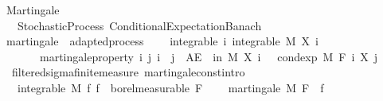 %
\begin{isabellebody}%
%
%
\isadelimtheory
%
\endisadelimtheory
%
\isatagtheory
{}\isamarkupfalse%
\ Martingale\ \ \ \ \ \ \ \ \ \ \ \ \ \ \ \ \ \isanewline
\ \ \ Stochastic{\isacharunderscore}{\kern0pt}Process\ Conditional{\isacharunderscore}{\kern0pt}Expectation{\isacharunderscore}{\kern0pt}Banach\isanewline
{}%
\endisatagtheory
{\isafoldtheory}%
%
\isadelimtheory
%
\endisadelimtheory
%
\isadelimdocument
%
\endisadelimdocument
%
\isatagdocument
%
\isamarkuptrue%
%
\endisatagdocument
{\isafolddocument}%
%
\isadelimdocument
%
\endisadelimdocument
{}\isamarkupfalse%
\ martingale\ {\isacharequal}{\kern0pt}\ adapted{\isacharunderscore}{\kern0pt}process\ {\isacharplus}{\kern0pt}\isanewline
\ \ \ integrable{\isacharcolon}{\kern0pt}\ {\isachardoublequoteopen}{\isasymAnd}i{\isachardot}{\kern0pt}\ integrable\ M\ {\isacharparenleft}{\kern0pt}X\ i{\isacharparenright}{\kern0pt}{\isachardoublequoteclose}\isanewline
\ \ \ \ \ \ \ martingale{\isacharunderscore}{\kern0pt}property{\isacharcolon}{\kern0pt}\ {\isachardoublequoteopen}{\isasymAnd}i\ j{\isachardot}{\kern0pt}\ i\ {\isasymle}\ j\ {\isasymLongrightarrow}\ AE\ {\isasymxi}\ in\ M{\isachardot}{\kern0pt}\ X\ i\ {\isasymxi}\ {\isacharequal}{\kern0pt}\ cond{\isacharunderscore}{\kern0pt}exp\ M\ {\isacharparenleft}{\kern0pt}F\ i{\isacharparenright}{\kern0pt}\ {\isacharparenleft}{\kern0pt}X\ j{\isacharparenright}{\kern0pt}\ {\isasymxi}{\isachardoublequoteclose}\isanewline
\isanewline
{}\isamarkupfalse%
\ {\isacharparenleft}{\kern0pt}\ filtered{\isacharunderscore}{\kern0pt}sigma{\isacharunderscore}{\kern0pt}finite{\isacharunderscore}{\kern0pt}measure{\isacharparenright}{\kern0pt}\ martingale{\isacharunderscore}{\kern0pt}const{\isacharbrackleft}{\kern0pt}intro{\isacharbrackright}{\kern0pt}{\isacharcolon}{\kern0pt}\ \ \isanewline
\ \ \ {\isachardoublequoteopen}integrable\ M\ f{\isachardoublequoteclose}\ {\isachardoublequoteopen}f\ {\isasymin}\ borel{\isacharunderscore}{\kern0pt}measurable\ {\isacharparenleft}{\kern0pt}F\ {\isasymbottom}{\isacharparenright}{\kern0pt}{\isachardoublequoteclose}\isanewline
\ \ \ {\isachardoublequoteopen}martingale\ M\ F\ {\isacharparenleft}{\kern0pt}{\isasymlambda}{\isacharunderscore}{\kern0pt}{\isachardot}{\kern0pt}\ f{\isacharparenright}{\kern0pt}{\isachardoublequoteclose}\isanewline
%
\isadelimproof
\ \ %
\endisadelimproof

\end{isabellebody}
